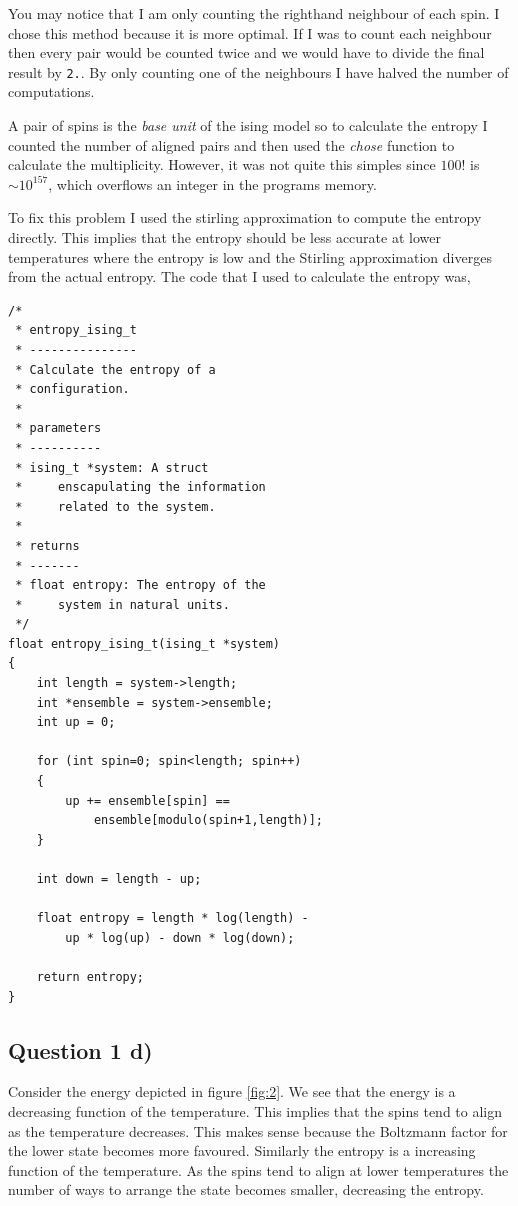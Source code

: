 \documentclass[a4paper, twocolumn]{article}
\begin{document}
You may notice that I am only counting the righthand neighbour %
of each spin. I chose this method because it is more optimal. %
If I was to count each neighbour then every pair would be %
counted twice and we would have to divide the final result by %
\verb!2.!. By only counting one of the neighbours I have %
halved the number of computations. 


A pair of spins is the \emph{base unit} of the ising model %
so to calculate the entropy I counted the number of aligned %
pairs and then used the \emph{chose} function to calculate %
the multiplicity. However, it was not quite this simples %
since \(100!\) is \(\sim 10^{157}\), which overflows an %
integer in the programs memory. 


To fix this problem I used the stirling approximation to %
compute the entropy directly. This implies that the %
entropy should be less accurate at lower temperatures %
where the entropy is low and the Stirling approximation %
diverges from the actual entropy. The code that I used %
to calculate the entropy was,

\begin{lstlisting}
/*
 * entropy_ising_t
 * ---------------
 * Calculate the entropy of a 
 * configuration. 
 *
 * parameters
 * ----------
 * ising_t *system: A struct 
 *     enscapulating the information 
 *     related to the system. 
 *
 * returns
 * -------
 * float entropy: The entropy of the
 *     system in natural units. 
 */
float entropy_ising_t(ising_t *system)
{ 
    int length = system->length;
    int *ensemble = system->ensemble; 
    int up = 0;

    for (int spin=0; spin<length; spin++)
    {
        up += ensemble[spin] == 
            ensemble[modulo(spin+1,length)];
    }

    int down = length - up;

    float entropy = length * log(length) - 
        up * log(up) - down * log(down);
    
    return entropy;   
}
\end{lstlisting}


\subsection*{Question 1 d)}
Consider the energy depicted in figure \ref{fig:2}. We see that %
the energy is a decreasing function of the temperature. This %
implies that the spins tend to align as the temperature decreases. %
This makes sense because the Boltzmann factor for the lower state %
becomes more favoured. Similarly the entropy is a increasing %
function of the temperature. As the spins tend to align at lower %
temperatures the number of ways to arrange the state becomes %
smaller, decreasing the entropy. 
\end{document}
